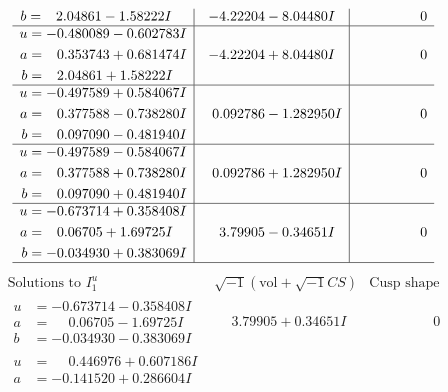 \documentclass[1p]{elsarticle_modified}
\theoremstyle{definition}
\newcommand{\I}{\sqrt{-1}}
\begin{document}
$$\begin{array}{c|c|c}
\begin{aligned}
b &= \phantom{-}2.04861 - 1.58222 I\end{aligned}
 & -4.22204 - 8.04480 I & \phantom{-0.000000 } 0 \\ \hline\begin{aligned}
u &= -0.480089 - 0.602783 I \\
a &= \phantom{-}0.353743 + 0.681474 I \\
b &= \phantom{-}2.04861 + 1.58222 I\end{aligned}
 & -4.22204 + 8.04480 I & \phantom{-0.000000 } 0 \\ \hline\begin{aligned}
u &= -0.497589 + 0.584067 I \\
a &= \phantom{-}0.377588 - 0.738280 I \\
b &= \phantom{-}0.097090 - 0.481940 I\end{aligned}
 & \phantom{-}0.092786 - 1.282950 I & \phantom{-0.000000 } 0 \\ \hline\begin{aligned}
u &= -0.497589 - 0.584067 I \\
a &= \phantom{-}0.377588 + 0.738280 I \\
b &= \phantom{-}0.097090 + 0.481940 I\end{aligned}
 & \phantom{-}0.092786 + 1.282950 I & \phantom{-0.000000 } 0 \\ \hline\begin{aligned}
u &= -0.673714 + 0.358408 I \\
a &= \phantom{-}0.06705 + 1.69725 I \\
b &= -0.034930 + 0.383069 I\end{aligned}
 & \phantom{-}3.79905 - 0.34651 I & \phantom{-0.000000 } 0\\
 \hline 
 \end{array}$$\newpage$$\begin{array}{c|c|c}  
\text{Solutions to }I^u_{1}& \I (\text{vol} + \sqrt{-1}CS) & \text{Cusp shape}\\
 \hline 
\begin{aligned}
u &= -0.673714 - 0.358408 I \\
a &= \phantom{-}0.06705 - 1.69725 I \\
b &= -0.034930 - 0.383069 I\end{aligned}
 & \phantom{-}3.79905 + 0.34651 I & \phantom{-0.000000 } 0 \\ \hline\begin{aligned}
u &= \phantom{-}0.446976 + 0.607186 I \\
a &= -0.141520 + 0.286604 I \\

\end{aligned}
\end{array}$$
\end{document}
